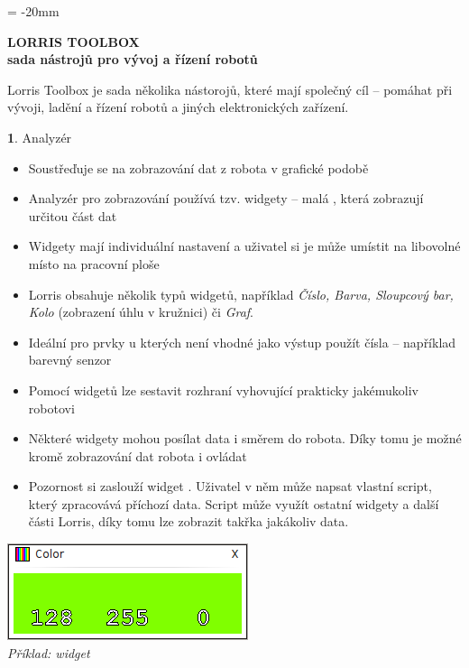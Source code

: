 \documentclass[12pt, a4paper, oneside]{article}
\newcommand{\B}{\textbf} %
\newcommand{\It}{\textit}  %
\begin{document}

\pagestyle{empty} %
 
\voffset = -20mm %
\enlargethispage{60mm} %

\begin{center}
    \Large \B{LORRIS TOOLBOX \\ sada nástrojů pro vývoj a řízení robotů}
\end{center}
\vspace{5mm}
\setlength{\footskip}{0pt}
\setlength{\textheight}{750pt}

Lorris Toolbox je sada několika nástorojů, které mají společný cíl -- pomáhat při vývoji, ladění a řízení robotů a jiných elektronických zařízení.

{\large \B 1. Analyzér }
\begin{itemize}
    \item Soustřeďuje se na zobrazování dat z robota v grafické podobě
    \item Analyzér pro zobrazování používá tzv. widgety -- malá , která zobrazují určitou část dat
    \item Widgety mají individuální nastavení a uživatel si je může umístit na libovolné místo na pracovní ploše
    \item Lorris obsahuje několik typů widgetů, například \It{ Číslo, Barva, Sloupcový bar, Kolo} (zobrazení úhlu v kružnici) či \It{Graf}.
    \item Ideální pro prvky u kterých není vhodné jako výstup použít čísla -- například barevný senzor
    \item Pomocí widgetů lze sestavit rozhraní vyhovující prakticky jakémukoliv robotovi
    \item Některé widgety mohou posílat data i směrem do robota. Díky tomu je možné kromě zobrazování dat robota i ovládat
    \item Pozornost si zaslouží widget . Uživatel v něm může napsat vlastní script, který zpracovává příchozí data. Script může využít ostatní widgety a další části Lorris, díky tomu lze zobrazit takřka jakákoliv data.
\end{itemize}
\begin{center}
\includegraphics{img/color.png} \\
\It{Příklad: widget }
\end{center}
\end{document}
